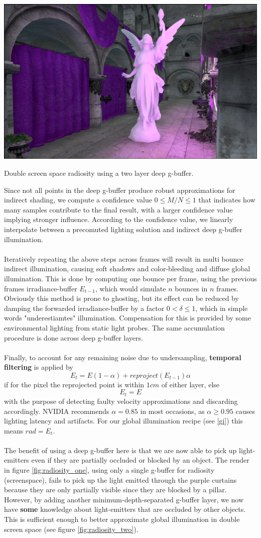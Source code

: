 \documentclass{ACGSeminar}
\begin{document}
		\begin{floatingfigure}[r]{.5\textwidth}%
			\includegraphics[width=.5\textwidth]{img/radiosity_two.png}
			\caption{Double screen space radiosity using a two layer deep g-buffer.}%
			\label{fig:radiosity_two}%
		\end{floatingfigure}%
		Since not all points in the deep g-buffer produce robust approximations for indirect shading, we compute a confidence value $0 \leq M/N \leq 1$ that indicates how many samples contribute to the final result, with a larger confidence value implying stronger influence. According to the confidence value, we linearly interpolate between a precomuted lighting solution and indirect deep g-buffer illumination. \\\\
		Iteratively repeating the above steps across frames will result in multi bounce indirect illumination, causing soft shadows and color-bleeding and diffuse global illumination. This is done by computing one bounce per frame, using the previous frames irradiance-buffer $E_{t-1}$, which would simulate $n$ bounces in $n$ frames. Obviously this method is prone to ghosting, but its effect can be reduced by damping the forwarded irradiance-buffer by a factor $0 < \delta \leq 1$, which in simple words "underestiamtes" illumination. Compensation for this is provided by some environmental lighting from static light probes. The same accumulation procedure is done across deep g-buffer layers. \\\\
		Finally, to account for any remaining noise due to undersampling, \textbf{temporal filtering} is applied by
		$$ E_t = E(1 - \alpha) + reproject(E_{t-1}) \alpha $$
		if for the pixel the reprojected point is within $1cm$ of either layer, else
		$$ E_t = E $$
		with the purpose of detecting faulty velocity approximations and discarding accordingly. NVIDIA recommends $\alpha = 0.85$ in most occasions, as $\alpha \geq 0.95$ causes lighting latency and artifacts. For our global illumination recipe (see \ref{gi}) this means $ rad = E_t$.
		\\\\
		The benefit of using a deep g-buffer here is that we are now able to pick up light-emitters even if they are partially occluded or blocked by an object. The render in figure \ref{fig:radiosity_one}, using only a single g-buffer for radiosity (screenspace), fails to pick up the light emitted through the purple curtains because they are only partially visible since they are blocked by a pillar. However, by adding another minimum-depth-separated g-buffer layer, we now have \textbf{some} knowledge about light-emitters that are occluded by other objects. This is sufficient enough to better approximate global illumination in double screen space (see figure \ref{fig:radiosity_two}).
\end{document}
